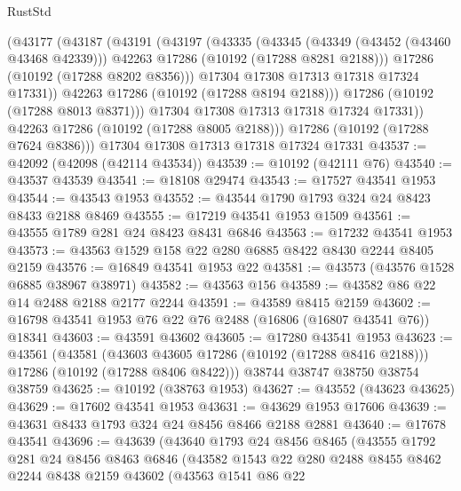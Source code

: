 \begin{lexlean}{RustStd}
\begin{coremodule}
            (@43177
              (@43187
                (@43191
                  (@43197
                    (@43335
                      (@43345
                        (@43349 (@43452 (@43460 @43468 @42339)))
                        @42263
                        @17286
                        (@10192 (@17288 @8281 @2188)))
                      @17286
                      (@10192 (@17288 @8202 @8356)))
                    @17304
                    @17308
                    @17313
                    @17318
                    @17324
                    @17331))
                @42263
                @17286
                (@10192 (@17288 @8194 @2188)))
              @17286
              (@10192 (@17288 @8013 @8371)))
            @17304
            @17308
            @17313
            @17318
            @17324
            @17331))
        @42263
        @17286
        (@10192 (@17288 @8005 @2188)))
      @17286
      (@10192 (@17288 @7624 @8386)))
    @17304
    @17308
    @17313
    @17318
    @17324
    @17331
@43537 := @42092 (@42098 (@42114 @43534))
@43539 := @10192 (@42111 @76)
@43540 := @43537 @43539
@43541 := @18108 @29474
@43543 := @17527 @43541 @1953
@43544 := @43543 @1953
@43552 := @43544 @1790 @1793 @324 @24 @8423 @8433 @2188 @8469
@43555 := @17219 @43541 @1953 @1509
@43561 := @43555 @1789 @281 @24 @8423 @8431 @6846
@43563 := @17232 @43541 @1953
@43573 := @43563 @1529 @158 @22 @280 @6885 @8422 @8430 @2244 @8405 @2159
@43576 := @16849 @43541 @1953 @22
@43581 := @43573 (@43576 @1528 @6885 @38967 @38971)
@43582 := @43563 @156
@43589 := @43582 @86 @22 @14 @2488 @2188 @2177 @2244
@43591 := @43589 @8415 @2159
@43602 := @16798 @43541 @1953 @76 @22 @76 @2488 (@16806 (@16807 @43541 @76)) @18341
@43603 := @43591 @43602
@43605 := @17280 @43541 @1953
@43623 := @43561
    (@43581
      (@43603 @43605 @17286 (@10192 (@17288 @8416 @2188)))
      @17286
      (@10192 (@17288 @8406 @8422)))
    @38744
    @38747
    @38750
    @38754
    @38759
@43625 := @10192 (@38763 @1953)
@43627 := @43552 (@43623 @43625)
@43629 := @17602 @43541 @1953
@43631 := @43629 @1953 @17606
@43639 := @43631 @8433 @1793 @324 @24 @8456 @8466 @2188 @2881
@43640 := @17678 @43541
@43696 := @43639
    (@43640
      @1793
      @24
      @8456
      @8465
      (@43555
        @1792
        @281
        @24
        @8456
        @8463
        @6846
        (@43582
          @1543
          @22
          @280
          @2488
          @8455
          @8462
          @2244
          @8438
          @2159
          @43602
          (@43563
            @1541
            @86
            @22

\end{coremodule}
\end{lexlean}
